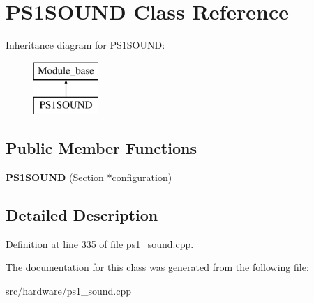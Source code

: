 \hypertarget{classPS1SOUND}{\section{P\-S1\-S\-O\-U\-N\-D Class Reference}
\label{classPS1SOUND}
}
Inheritance diagram for P\-S1\-S\-O\-U\-N\-D\-:\begin{figure}[H]
\begin{center}
\leavevmode
\includegraphics[height=2.000000cm]{classPS1SOUND}
\end{center}
\end{figure}
\subsection*{Public Member Functions}
\begin{DoxyCompactItemize}
\item 
\hypertarget{classPS1SOUND_a0f344bb539a95ca1f5036ba76cc6a5eb}{{\bfseries P\-S1\-S\-O\-U\-N\-D} (\hyperlink{classSection}{Section} $\ast$configuration)}\label{classPS1SOUND_a0f344bb539a95ca1f5036ba76cc6a5eb}

\end{DoxyCompactItemize}


\subsection{Detailed Description}


Definition at line 335 of file ps1\-\_\-sound.\-cpp.



The documentation for this class was generated from the following file\-:\begin{DoxyCompactItemize}
\item 
src/hardware/ps1\-\_\-sound.\-cpp\end{DoxyCompactItemize}
